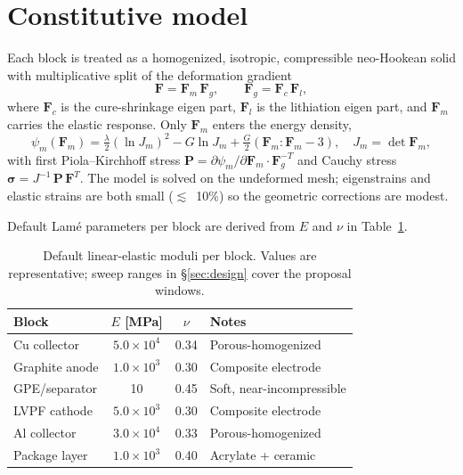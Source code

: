 \documentclass[11pt,letterpaper]{article}
\begin{document}
\section{Constitutive model}

Each block is treated as a homogenized, isotropic, compressible
neo-Hookean solid with multiplicative split of the deformation gradient
\begin{equation}
\mathbf{F} = \mathbf{F}_m \, \mathbf{F}_g, \qquad
\mathbf{F}_g = \mathbf{F}_c \, \mathbf{F}_l ,
\label{eq:multi-split}
\end{equation}
where $\mathbf{F}_c$ is the cure-shrinkage eigen part, $\mathbf{F}_l$ is
the lithiation eigen part, and $\mathbf{F}_m$ carries the elastic
response.  Only $\mathbf{F}_m$ enters the energy density,
\begin{equation}
\psi_m(\mathbf{F}_m) = \tfrac{\lambda}{2}(\ln J_m)^2 - G \ln J_m
+ \tfrac{G}{2}(\mathbf{F}_m\!:\!\mathbf{F}_m - 3),
\quad J_m = \det \mathbf{F}_m ,
\end{equation}
with first Piola--Kirchhoff stress $\mathbf{P} = \partial \psi_m /
\partial \mathbf{F}_m \cdot \mathbf{F}_g^{-T}$ and Cauchy stress
$\bm{\sigma} = J^{-1}\,\mathbf{P}\,\mathbf{F}^T$.  The model is solved
on the undeformed mesh; eigenstrains and elastic strains are both small
($\lesssim$~10\%) so the geometric corrections are modest.

Default Lam\'e parameters per block are derived from $E$ and $\nu$ in
Table~\ref{tab:moduli}.

\begin{table}[H]
\centering
\caption{Default linear-elastic moduli per block.  Values are
representative; sweep ranges in \S\ref{sec:design} cover the proposal
windows.}
\label{tab:moduli}
\begin{tabular}{lccl}
\toprule
Block          & $E$ [MPa] & $\nu$ & Notes \\
\midrule
Cu collector   & $5.0\times 10^{4}$ & 0.34 & Porous-homogenized \\
Graphite anode & $1.0\times 10^{3}$ & 0.30 & Composite electrode \\
GPE/separator  & 10                 & 0.45 & Soft, near-incompressible \\
LVPF cathode   & $5.0\times 10^{3}$ & 0.30 & Composite electrode \\
Al collector   & $3.0\times 10^{4}$ & 0.33 & Porous-homogenized \\
Package layer  & $1.0\times 10^{3}$ & 0.40 & Acrylate + ceramic \\
\bottomrule
\end{tabular}
\end{table}
\end{document}
